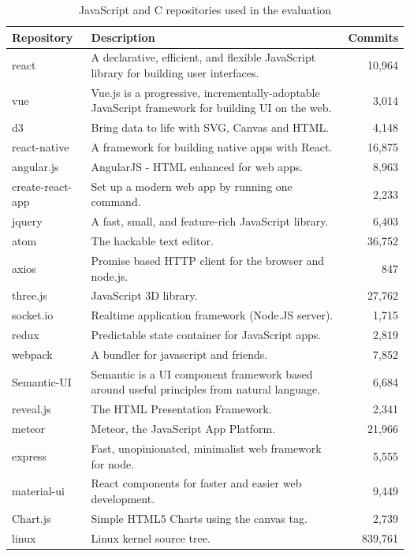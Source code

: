 \documentclass[10pt,journal,compsoc]{IEEEtran}
\begin{document}
\begin{table}[htbp]
\renewcommand{\arraystretch}{1.2}
\caption{JavaScript and C repositories used in the evaluation}
\label{TabJsCRepos}
\centering
\begin{tabular}{@{}lp{13cm}r@{}}
\toprule
Repository & Description & Commits\\
\midrule
react & A declarative, efficient, and flexible JavaScript library for building user interfaces. & 10,964 \\
vue & Vue.js is a progressive, incrementally-adoptable JavaScript framework for building UI on the web. & 3,014 \\
d3 & Bring data to life with SVG, Canvas and HTML. & 4,148 \\
react-native & A framework for building native apps with React. & 16,875 \\
angular.js & AngularJS - HTML enhanced for web apps. & 8,963 \\
create-react-app & Set up a modern web app by running one command. & 2,233 \\
jquery & A fast, small, and feature-rich JavaScript library. & 6,403 \\
atom & The hackable text editor. & 36,752 \\
axios & Promise based HTTP client for the browser and node.js. & 847 \\
three.js & JavaScript 3D library. & 27,762 \\
socket.io & Realtime application framework (Node.JS server). & 1,715 \\
redux & Predictable state container for JavaScript apps. & 2,819 \\
webpack & A bundler for javascript and friends. & 7,852 \\
Semantic-UI & Semantic is a UI component framework based around useful principles from natural language. & 6,684 \\
reveal.js & The HTML Presentation Framework. & 2,341 \\
meteor & Meteor, the JavaScript App Platform. & 21,966 \\
express & Fast, unopinionated, minimalist web framework for node. & 5,555 \\
material-ui & React components for faster and easier web development. & 9,449 \\
Chart.js & Simple HTML5 Charts using the canvas tag. & 2,739 \\
\midrule
linux & Linux kernel source tree. & 839,761 \\

\end{tabular}
\end{table}
\end{document}
